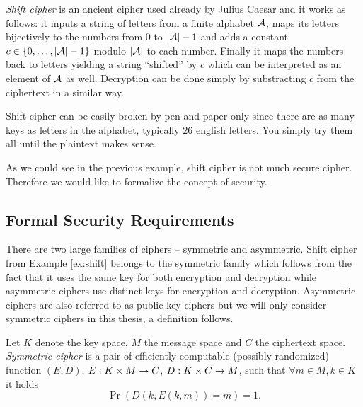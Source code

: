 \begin{example}
\label{ex:shift}
	{\em Shift cipher} is an ancient cipher used already by Julius Caesar and it works as follows: it inputs a string of letters from a finite alphabet $\cal A$, maps its letters bijectively to the numbers from $0$ to $|{\cal A}|-1$ and adds a constant $c\in\{0 , \ldots , |{\cal A}|-1\}$ modulo $|\cal A|$ to each number. Finally it maps the numbers back to letters yielding a string ``shifted'' by $c$ which can be interpreted as an element of $\cal A$ as well. Decryption can be done simply by substracting $c$ from the ciphertext in a similar way.
	
	Shift cipher can be easily broken by pen and paper only since there are as many keys as letters in the alphabet, typically $26$ english letters. You simply try them all until the plaintext makes sense.
\end{example}

As we could see in the previous example, shift cipher is not much secure cipher. Therefore we would like to formalize the concept of security.


\subsection{Formal Security Requirements}

There are two large families of ciphers -- symmetric and asymmetric. Shift cipher from Example \ref{ex:shift} belongs to the symmetric family which follows from the fact that it uses the same key for both encryption and decryption while asymmetric ciphers use distinct keys for encryption and decryption. Asymmetric ciphers are also referred to as public key ciphers but we will only consider symmetric ciphers in this thesis, a definition follows.

\begin{defn}
	Let $K$ denote the key space, $M$ the message space and $C$ the ciphertext space. {\em Symmetric cipher} is a pair of efficiently computable (possibly randomized) function $(E,D)$, $E:K\times M\rightarrow C$, $D:K\times C\rightarrow M$, such that $\forall m\in M, k\in K$ it holds
	\begin{equation}
		\Pr\left(D(k,E(k,m))=m\right) = 1 . \label{eq:correct}
	\end{equation}
\end{defn}

